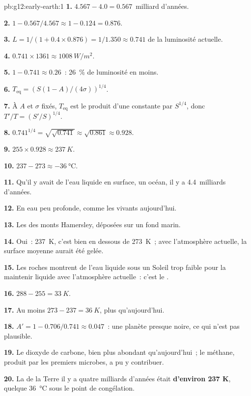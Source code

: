 \begin{solution}{pb:g12:early-earth:1}
\textbf{1.} $4.567 - 4.0 = 0.567$~milliard d'années.

\textbf{2.} $1 - 0.567/4.567 \approx 1 - 0.124 = 0.876$.

\textbf{3.} $L = 1/(1 + 0.4 \times 0.876) = 1/1.350 \approx 0.741$ de la
luminosité actuelle.

\textbf{4.} $0.741 \times 1361 \approx \qty{1008}{W/m^2}$.

\textbf{5.} $1 - 0.741 \approx 0.26$~: \qty{26}{\percent} de luminosité en
moins.

\textbf{6.} $T_{\mathrm{eq}} = \left(S(1-A)/(4\sigma)\right)^{1/4}$.

\textbf{7.} À $A$ et $\sigma$ fixés, $T_{\mathrm{eq}}$ est le produit d'une
constante par $S^{1/4}$, donc $T'/T = (S'/S)^{1/4}$.

\textbf{8.} $0.741^{1/4} = \sqrt{\sqrt{0.741}} \approx \sqrt{0.861} \approx
0.928$.

\textbf{9.} $255 \times 0.928 \approx \qty{237}{K}$.

\textbf{10.} $237 - 273 \approx \qty{-36}{\celsius}$.

\textbf{11.} Qu'il y avait de l'eau liquide en surface, un océan, il y a
4.4~milliards d'années.

\textbf{12.} En eau peu profonde, comme les  vivants
aujourd'hui.

\textbf{13.} Les  des monts Hamersley, déposées sur
un fond marin.

\textbf{14.} Oui~: \qty{237}{K}, c'est bien en dessous de \qty{273}{K}~;
avec l'atmosphère actuelle, la surface moyenne aurait été gelée.

\textbf{15.} Les roches montrent de l'eau liquide sous un Soleil trop
faible pour la maintenir liquide avec l'atmosphère actuelle~: c'est le
.

\textbf{16.} $288 - 255 = \qty{33}{K}$.

\textbf{17.} Au moins $273 - 237 = \qty{36}{K}$, plus qu'aujourd'hui.

\textbf{18.} $A' = 1 - 0.706/0.741 \approx 0.047$~: une planète presque
noire, ce qui n'est pas plausible.

\textbf{19.} Le dioxyde de carbone, bien plus abondant qu'aujourd'hui~; le
méthane, produit par les premiers microbes, a pu y contribuer.

\textbf{20.} La  de la Terre il y a quatre
milliards d'années était \textbf{d'environ 237 K}, quelque
\qty{36}{\celsius} sous le point de congélation.
\end{solution}
